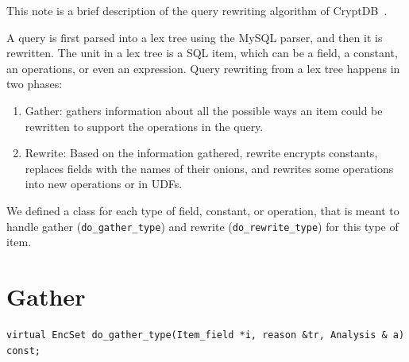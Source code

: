 \documentclass[11pt]{article}
\begin{document}
\newcommand{\adjjoin}{\textsf{ADJ-JOIN}}

\newcommand{\rap}[1]{\textcolor{blue}{RAP: #1}}
\newcommand{\nz}[1]{\textcolor{red}{NZ: #1}}
\newcommand{\todo}[1]{\noindent{\small \textcolor{blue}{Todo: #1}}}
\newcommand{\draft}[1]{\textcolor{red}{#1}}



\newcommand{\adv}{\mathsf{Adv}}
\newcommand{\ch}{\mathsf{Ch}}


\newtheorem{definition}{Definition}
\newtheorem{theorem}{Theorem}
\newtheorem{remark}{Remark}
\newtheorem{lemma}[theorem]{Lemma}
\newtheorem{corollary}[theorem]{Corollary}
\newtheorem{proposition}[theorem]{Proposition}
\newtheorem{claim}[theorem]{Claim}
\newtheorem{observation}{Observation}


\maketitle

This note is a brief description of the query rewriting algorithm of
CryptDB~\cite{PopaRZB11:CryptDB}. 



A query is first parsed into a lex tree using the MySQL parser, and then it is
rewritten. The unit in a lex tree is a SQL item, which can be a field, a constant,
an operations, or even an expression.
Query rewriting from a lex tree happens in two phases:
\begin{enumerate}
  \item Gather: gathers information about all the possible ways an item could be
    rewritten to support the operations in the query.
  \item Rewrite: Based on the information gathered, rewrite encrypts constants,
    replaces fields with the names of their onions, and rewrites some operations
    into new operations or in UDFs.
\end{enumerate}

We defined a class for each type of field, constant, or operation, that is meant
to handle gather (\texttt{do\_gather\_type}) and rewrite
(\texttt{do\_rewrite\_type}) for this type of item. 


\section{Gather}

\begin{lstlisting}
virtual EncSet do_gather_type(Item_field *i, reason &tr, Analysis & a) const;
\end{lstlisting}
\end{document}
